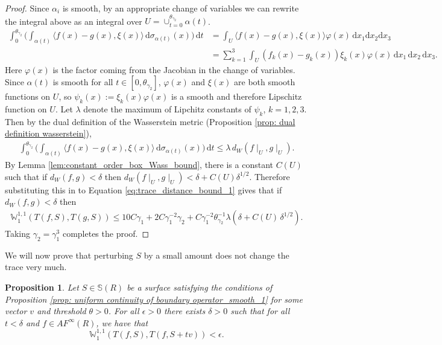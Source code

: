 \documentclass[11pt]{article}
\newtheorem{prop}[thm]{Proposition}
\theoremstyle{remark}
\theoremstyle{definition}
\newcommand{\m}[1]{\mathbb{#1}}
\newcommand{\dd}{\mathrm{d}}
\begin{document}
\begin{proof}
Since $\alpha_i$ is smooth, by an appropriate change of variables we can rewrite the integral above as an integral over $U = \cup_{t=0}^{\theta_{\gamma_2}} \alpha(t)$.
\begin{align*}
    \int_{0}^{\theta_{\gamma_2}}\bigg(\int_{\alpha(t)} \langle f (x)-g(x), \xi(x) \rangle\, \dd \sigma_{\alpha(t)} (x)\bigg)\, \dd t &= \int_{U} \langle f(x)-g(x), \xi(x)\rangle \varphi(x) \, \dd x_1 \dd x_2 \dd x_3\\&= \sum_{k=1}^3 \int_{U} (f_k(x)-g_k(x)) \xi_k(x) \varphi(x) \, \dd x_1 \, \dd x_2 \, \dd x_3. 
\end{align*}
Here $\varphi(x)$ is the factor coming from the Jacobian in the change of variables. Since $\alpha(t)$ is smooth for all $t\in[0,\theta_{\gamma_2}]$, $\varphi(x)$ and $\xi(x)$ are both smooth functions on $U$, so $\psi_k(x):=\xi_k(x) \varphi(x)$ is a smooth and therefore Lipschitz function on $U$. Let $\lambda$ denote the maximum of Lipchitz constants of $\psi_k$, $k=1,2,3$. Then by the dual definition of the Wasserstein metric (Proposition \ref{prop: dual definition wasserstein}), 
\begin{align*}
    \int_{0}^{\theta_{\gamma_2}}\bigg(\int_{\alpha(t)} \langle f (x)-g(x), \xi(x) \rangle\, \dd \sigma_{\alpha(t)} (x)\bigg)\, \dd t \leq \lambda\, d_W(f\mid_U, g\mid_U).
\end{align*}
By Lemma \ref{lem:constant_order_box_Wass_bound}, there is a constant $C(U)$ such that if $d_W(f,g)<\delta$ then $d_W(f\mid_U,g\mid_U) < \delta + C(U) \delta^{1/2}$. Therefore substituting this in to Equation \eqref{eq:trace_distance_bound_1} gives that if $d_W(f,g)<\delta$ then
\begin{align*}
	\m W^{1,1}_1(T(f, S), T(g, S)) \leq 10 C \gamma_1 + 2C\gamma_1^{-2} \gamma_2+ C \gamma_1^{-2} \theta_{\gamma_2}^{-1} \lambda(\delta+ C(U) \, \delta^{1/2}).
\end{align*}
Taking $\gamma_2=\gamma_1^3$ completes the proof.
\end{proof}


We will now prove that perturbing $S$ by a small amount does not change the trace very much.

\begin{prop}\label{prop: uniform continuity of boundary operator_smooth_2}
	Let $S\in \m S(R)$ be a surface satisfying the conditions of Proposition \ref{prop: uniform continuity of boundary operator_smooth_1} for some vector $v$ and threshold $\theta>0$.
	For all $\epsilon>0$ there exists $\delta>0$ such that for all  $t<\delta$ and $f\in AF^\infty(R)$, we have that $$\m W^{1,1}_1(T(f, S), T(f, S+tv))<\epsilon.$$
\end{prop}
\end{document}
